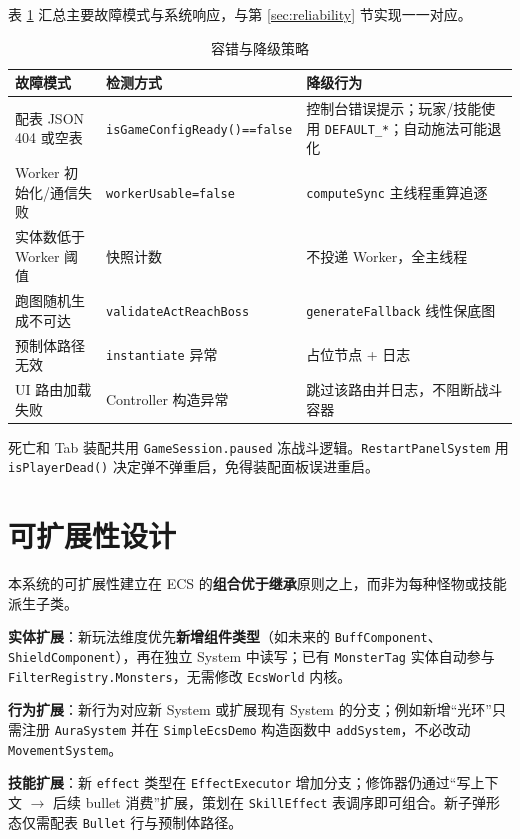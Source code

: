\documentclass[UTF8,a4paper]{ctexart}
\begin{document}
表 \ref{tab:fault-tolerance} 汇总主要故障模式与系统响应，与第 \ref{sec:reliability} 节实现一一对应。

\begin{table}[htbp]
  
  \caption{容错与降级策略}
  \label{tab:fault-tolerance}
  \begin{tabular}{p{3.2cm}p{4.0cm}p{5.8cm}}
    \toprule
    \textbf{故障模式} & \textbf{检测方式} & \textbf{降级行为} \\
    \midrule
    配表 JSON 404 或空表 & \texttt{isGameConfigReady()==false} & 控制台错误提示；玩家/技能使用 \texttt{DEFAULT\_*}；自动施法可能退化 \\
    Worker 初始化/通信失败 & \texttt{workerUsable=false} & \texttt{computeSync} 主线程重算追逐 \\
    实体数低于 Worker 阈值 & 快照计数 & 不投递 Worker，全主线程 \\
    跑图随机生成不可达 & \texttt{validateActReachBoss} & \texttt{generateFallback} 线性保底图 \\
    预制体路径无效 & \texttt{instantiate} 异常 & 占位节点 + 日志 \\
    UI 路由加载失败 & Controller 构造异常 & 跳过该路由并日志，不阻断战斗容器 \\
  \bottomrule
  \end{tabular}
\end{table}

死亡和 Tab 装配共用 \texttt{GameSession.paused} 冻战斗逻辑。\texttt{RestartPanelSystem} 用 \texttt{isPlayerDead()} 决定弹不弹重启，免得装配面板误进重启。

\section{可扩展性设计}
\label{sec:extensibility}

本系统的可扩展性建立在 ECS 的\textbf{组合优于继承}原则之上，而非为每种怪物或技能派生子类。

\textbf{实体扩展}：新玩法维度优先\textbf{新增组件类型}（如未来的 \texttt{BuffComponent}、\texttt{ShieldComponent}），再在独立 System 中读写；已有 \texttt{MonsterTag} 实体自动参与 \texttt{FilterRegistry.Monsters}，无需修改 \texttt{EcsWorld} 内核。

\textbf{行为扩展}：新行为对应新 System 或扩展现有 System 的分支；例如新增“光环”只需注册 \texttt{AuraSystem} 并在 \texttt{SimpleEcsDemo} 构造函数中 \texttt{addSystem}，不必改动 \texttt{MovementSystem}。

\textbf{技能扩展}：新 \texttt{effect} 类型在 \texttt{EffectExecutor} 增加分支；修饰器仍通过“写上下文 $\rightarrow$ 后续 bullet 消费”扩展，策划在 \texttt{SkillEffect} 表调序即可组合。新子弹形态仅需配表 \texttt{Bullet} 行与预制体路径。
\end{document}
